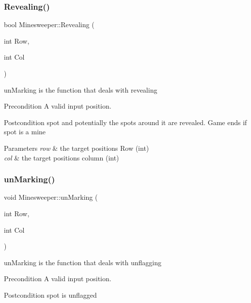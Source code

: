 \subsubsection{\texorpdfstring{Revealing()}{Revealing()}}
{\footnotesize\ttfamily bool Minesweeper\+::\+Revealing (\begin{DoxyParamCaption}\item[{int}]{Row,  }\item[{int}]{Col }\end{DoxyParamCaption})}



un\+Marking is the function that deals with revealing 

\begin{DoxyPrecond}{Precondition}
A valid input position. 
\end{DoxyPrecond}
\begin{DoxyPostcond}{Postcondition}
spot and potentially the spots around it are revealed. Game ends if spot is a mine 
\end{DoxyPostcond}

\begin{DoxyParams}{Parameters}
{\em row} & the target position\textquotesingle{}s Row (int) \\
\hline
{\em col} & the target position\textquotesingle{}s column (int) \\
\hline
\end{DoxyParams}
\mbox{\label{class_minesweeper_ad15ef447b75d2e8775eee43c493d29f4}} 
\subsubsection{\texorpdfstring{un\+Marking()}{unMarking()}}
{\footnotesize\ttfamily void Minesweeper\+::un\+Marking (\begin{DoxyParamCaption}\item[{int}]{Row,  }\item[{int}]{Col }\end{DoxyParamCaption})}



un\+Marking is the function that deals with unflagging 

\begin{DoxyPrecond}{Precondition}
A valid input position. 
\end{DoxyPrecond}
\begin{DoxyPostcond}{Postcondition}
spot is unflagged 
\end{DoxyPostcond}

